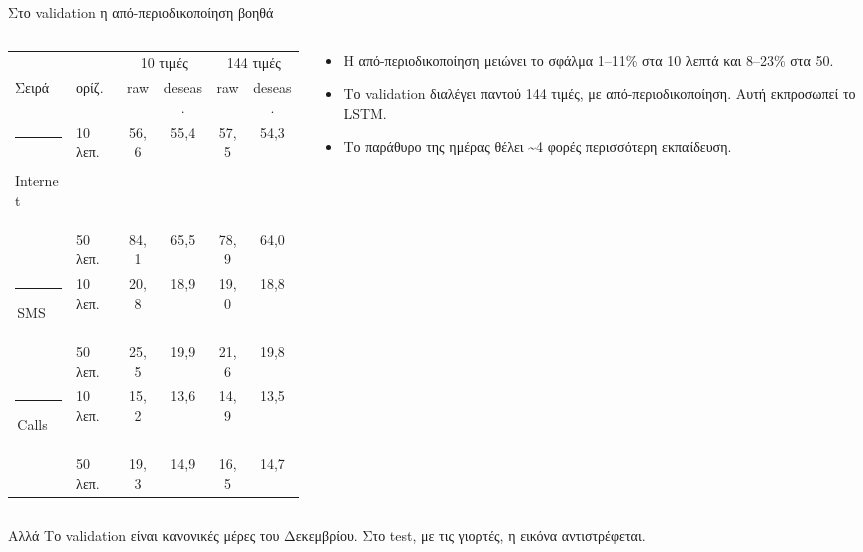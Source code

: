 \documentclass[aspectratio=169,10pt]{beamer}
\newcommand{\muted}[1]{\textcolor{muted}{#1}}
\newcommand{\figcap}[1]{\par\vspace{2pt}{\scriptsize\muted{#1}}}
\newcommand{\ser}[2]{\textcolor{#1}{\rule[0.05em]{0.6em}{0.6em}}\,#2}
\newcommand{\sInet}{\ser{inet}{Internet}}
\newcommand{\sSms}{\ser{sms}{SMS}}
\newcommand{\sCalls}{\ser{calls}{Calls}}
\begin{document}
\begin{frame}{Στο validation η από-περιοδικοποίηση βοηθά}
  \begin{columns}[T, onlytextwidth]
    \begin{column}{0.57\textwidth}
      \footnotesize
      \begin{tabular}{@{}llcccc@{}}
        \toprule
        & & \multicolumn{2}{c}{10 τιμές} & \multicolumn{2}{c}{144 τιμές} \\
        \cmidrule(lr){3-4}\cmidrule(l){5-6}
        Σειρά & ορίζ. & raw & deseas. & raw & deseas. \\
        \midrule
        \sInet   & 10\,λεπ. & 56,6 & 55,4 & 57,5 & \alert{54,3} \\
                 & 50\,λεπ. & 84,1 & 65,5 & 78,9 & \alert{64,0} \\
        \sSms    & 10\,λεπ. & 20,8 & 18,9 & 19,0 & \alert{18,8} \\
                 & 50\,λεπ. & 25,5 & 19,9 & 21,6 & \alert{19,8} \\
        \sCalls  & 10\,λεπ. & 15,2 & 13,6 & 14,9 & \alert{13,5} \\
                 & 50\,λεπ. & 19,3 & 14,9 & 16,5 & \alert{14,7} \\
        \bottomrule
      \end{tabular}
      \figcap{RMSE στο validation (τελευταίες 4,6 ημέρες του train). Έντονα: το καλύτερο ανά γραμμή.}
    \end{column}
    \begin{column}{0.4\textwidth}
      \small
      \begin{itemize}
        \item Η από-περιοδικοποίηση μειώνει το σφάλμα \alert{1–11\%} στα 10 λεπτά και \alert{8–23\%} στα 50.
        \item Το validation διαλέγει παντού \alert{144 τιμές, με από-περιοδικοποίηση}. Αυτή εκπροσωπεί το LSTM.
        \item Το παράθυρο της ημέρας θέλει \textasciitilde 4 φορές περισσότερη εκπαίδευση.
      \end{itemize}
    \end{column}
  \end{columns}
  \vspace{0.4em}
  \begin{block}{Αλλά}
    Το validation είναι κανονικές μέρες του Δεκεμβρίου. Στο test, με τις γιορτές, η εικόνα αντιστρέφεται.
  \end{block}
\end{frame}
\end{document}
